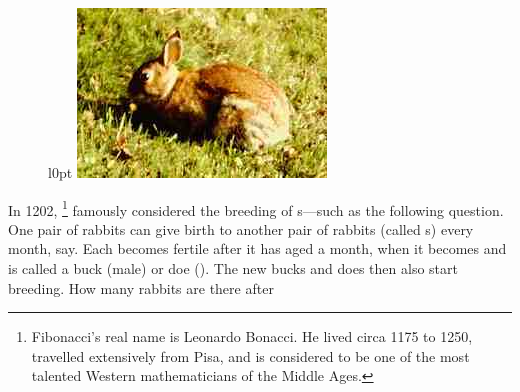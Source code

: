 \begin{figure}l{0pt}
\includegraphics[height=12ex]{Matrices/rabbit}
\end{figure}
\begin{example}
In 1202, \footnote{%
Fibonacci's real name is Leonardo Bonacci. 
He lived circa 1175 to 1250, travelled extensively from Pisa, and is considered to be one of the most talented Western mathematicians of the Middle Ages.} 
famously considered the breeding of s---such as the following question.
One pair of rabbits can give birth to another pair of rabbits (called s) every month, say.
Each  becomes fertile after it has aged a month, when it becomes  and is called a buck (male) or doe ().
The new bucks and does then also start breeding.
How many rabbits are there after 


\end{example}
